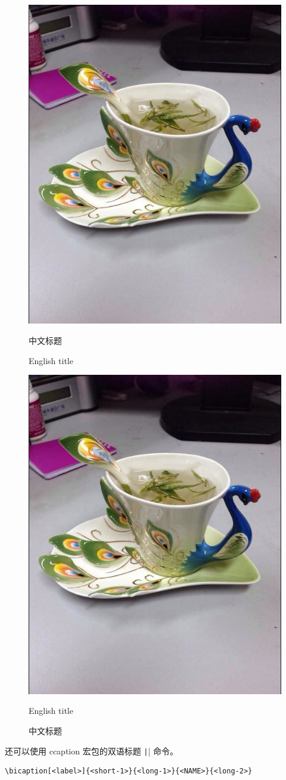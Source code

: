 \documentclass{article}
\newcommand{\mt}[1]{\texttt|#1|}
\begin{document}
\begin{figure}[htbp]
\begin{minipage}{.5\linewidth}\centering
	\includegraphics[width=.5\linewidth]{p1}
	\caption{中文标题}
	\addtocounter{figure}{-1}
	\vspace{-11pt}
	\renewcommand{\figurename}{Fig}
	\caption{English title}
\end{minipage}%
\begin{minipage}{.5\linewidth}\centering
	\includegraphics[width=.5\linewidth]{p1}
	\renewcommand{\figurename}{Fig}
	\caption{English title}
	\addtocounter{figure}{-1}
	\vspace{-11pt}
	\renewcommand{\figurename}{图}
	\caption{中文标题}
\end{minipage}
\end{figure}

还可以使用 ccaption 宏包的双语标题 \mt{\bicaption} 命令。
\begin{verbatim}
\bicaption[<label>]{<short-1>}{<long-1>}{<NAME>}{<long-2>}
\end{verbatim}
\end{document}

